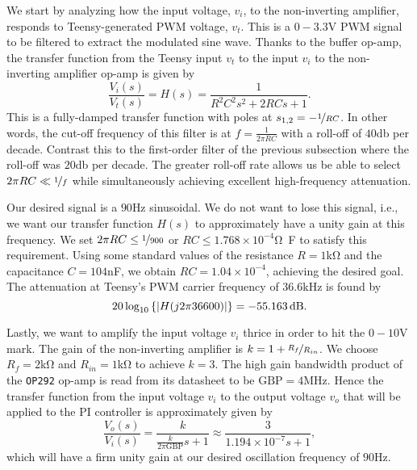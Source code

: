 We start by analyzing how the input voltage, $v_i$, to the non-inverting
amplifier, responds to Teensy-generated PWM voltage, $v_t$. This is a
$0-3.3$\unit{\volt} PWM signal to be filtered to extract the modulated sine
wave. Thanks to the buffer op-amp, the transfer function from the Teensy input
$v_t$ to the input $v_i$ to the non-inverting amplifier op-amp is given by
%
\begin{equation}
\frac{V_i(s)}{V_t(s)} = H(s) = \frac{1}{R^2C^2s^2+2RCs+1}.
\label{eq:tf}
\end{equation}
%
This is a fully-damped transfer function with poles at $s_{1,2} =
-\nicefrac{1}{RC}$. In other words, the cut-off frequency of this filter is at
$f = \frac{1}{2\pi RC}$ with a roll-off of $40$\unit{\decibel} per decade.
Contrast this to the first-order filter of the previous subsection where the
roll-off was $20$\unit{\decibel} per decade. The greater roll-off rate allows us
be able to select $2\pi RC \ll \nicefrac{1}{f}$ while simultaneously achieving
excellent high-frequency attenuation.

Our desired signal is a $90$\unit{\hertz} sinusoidal. We do not want to lose
this signal, i.e., we want our transfer function $H(s)$ to approximately have a
unity gain at this frequency. We set $2\pi RC \leq \nicefrac{1}{900}$ or $RC
\leq 1.768 \times 10^{-4}$\unit{\ohm\farad} to satisfy this requirement. Using
some standard values of the resistance $R = 1$\unit{\kilo\ohm} and the
capacitance $C = 104$\unit{\nano\farad}, we obtain $RC = 1.04 \times 10^{-4}$,
achieving the desired goal. The attenuation at Teensy's PWM carrier frequency of
$36.6$\unit{\kilo\hertz} is found by \[ 20 \log_{10}\left\{\abs{H(j 2\pi
36600)}\right\} = -55.163\,\unit{\decibel}. \]

Lastly, we want to amplify the input voltage $v_i$ thrice in order to hit the
$0-10$\unit{\volt} mark. The gain of the non-inverting amplifier is $k = 1 +
\nicefrac{R_f}{R_{in}}$. We choose $R_f = 2$\unit{\kilo\ohm} and $R_{in} =
1$\unit{\kilo\ohm} to achieve $k = 3$. The high gain bandwidth product of the
\texttt{OP292} op-amp is read from its datasheet to be $\text{GBP} =
4$\unit{\mega\hertz}. Hence the transfer function from the input voltage $v_i$
to the output voltage $v_o$ that will be applied to the PI controller is
approximately given by \[ \frac{V_o(s)}{V_i(s)} =
\frac{k}{\frac{k}{2\pi\text{GBP}}s + 1} \approx \frac{3}{1.194\times 10^{-7}s +
1}, \] which will have a firm unity gain at our desired oscillation frequency of
$90$\unit{\hertz}.


